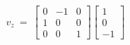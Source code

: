 \documentclass[preview]{standalone}
\begin{document}
\begin{align*}
v_z\ =\ \begin{bmatrix}
                        0 & -1 & 0\\
                        1 & 0 & 0 \\
                        0 & 0 & 1
                        \end{bmatrix}\begin{bmatrix}
                        1\\
                        0\\
                        -1
                        \end{bmatrix}\\
\end{align*}
\end{document}
